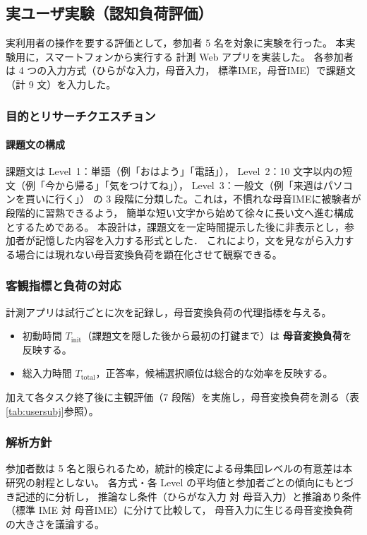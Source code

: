\subsection{実ユーザ実験（認知負荷評価）}
\label{subsec:user}
実利用者の操作を要する評価として，参加者 5 名を対象に実験を行った。
本実験用に，スマートフォンから実行する
計測 Web アプリを実装した。
各参加者は 4 つの入力方式（ひらがな入力，母音入力，
標準IME，母音IME）で課題文（計 9 文）を入力した。

\subsubsection{目的とリサーチクエスチョン}

\paragraph{課題文の構成}
課題文は Level~1：単語（例「おはよう」「電話」），
Level~2：10 文字以内の短文（例「今から帰る」「気をつけてね」），
Level~3：一般文（例「来週はパソコンを買いに行く」）
の 3 段階に分類した。これは，不慣れな母音IMEに被験者が段階的に習熟できるよう，
簡単な短い文字から始めて徐々に長い文へ進む構成とするためである。
本設計は，課題文を一定時間提示した後に非表示とし，参加者が記憶した内容を入力する形式とした．
これにより，文を見ながら入力する場合には現れない母音変換負荷を顕在化させて観察できる。

\subsubsection{客観指標と負荷の対応}
計測アプリは試行ごとに次を記録し，母音変換負荷の代理指標を与える。
\begin{itemize}
  \item 初動時間 $T_{\mathrm{init}}$（課題文を隠した後から最初の打鍵まで）は
        \textbf{母音変換負荷}を反映する。
  \item 総入力時間 $T_{\mathrm{total}}$，正答率，候補選択順位は総合的な効率を反映する。
\end{itemize}
加えて各タスク終了後に主観評価（7 段階）を実施し，母音変換負荷を測る（表\ref{tab:usersubj}参照）。

\subsubsection{解析方針}
参加者数は 5 名と限られるため，統計的検定による母集団レベルの有意差は本研究の射程としない。
各方式・各 Level の平均値と参加者ごとの傾向にもとづき記述的に分析し，
推論なし条件（ひらがな入力 対 母音入力）と推論あり条件（標準 IME 対 母音IME）に分けて比較して，
母音入力に生じる母音変換負荷の大きさを議論する。
